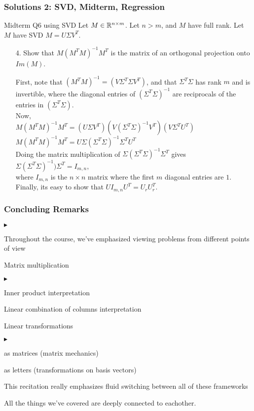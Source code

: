\documentclass{beamer}
\renewenvironment{itemize}
\renewenvironment{enumerate}%
{\begin{list}{\arabic{enumi}.}%
      {\setlength{\leftmargin}{2.5em}%
       \setlength{\itemsep}{-\parsep}%
       \setlength{\topsep}{-\parskip}%
       \usecounter{enumi}}%
 }{\end{list}}
\renewenvironment{itemize}%
{\begin{list}{$\blacktriangleright$}%
      {\setlength{\leftmargin}{2.5em}%
       \setlength{\itemsep}{-\parsep}%
       \setlength{\topsep}{-\parskip}%
       \usecounter{enumi}}%
 }{\end{list}}
\begin{document}
\begin{frame}
\frametitle{Solutions 2: SVD, Midterm, Regression}
Midterm Q6 using SVD
Let $M\in \mathbb{R}^{n\times m}$. Let $n>m$, and $M$ have full rank. Let $M$ have SVD $M= U\Sigma V^T$.
\begin{enumerate}
\item[4.] Show that $M(M^TM)^{-1}M^T$ is the matrix of an orthogonal projection onto $Im(M)$.
\begin{solution}
First, note that $(M^TM)^{-1} = (V \Sigma^T \Sigma V^T)$, and that $\Sigma^T \Sigma$ has rank $m$ and is invertible, where the diagonal entries of $(\Sigma^T \Sigma)^{-1}$ are reciprocals of the entries in $(\Sigma^T \Sigma)$. \\
Now,  \\
\quad $M(M^TM)^{-1}M^T = (U \Sigma V^T)(V (\Sigma^T \Sigma)^{-1} V^T)(V \Sigma^T U^T) $ \\ 
\quad $M(M^TM)^{-1}M^T = U \Sigma (\Sigma^T \Sigma)^{-1} \Sigma^T U^T $ \\ 
Doing the matrix multiplication of  $\Sigma (\Sigma^T \Sigma)^{-1} \Sigma^T $ gives \\

\quad $\Sigma (\Sigma^T \Sigma)^{-1}) \Sigma^T = I_{m,n}$,\\
where $I_{m,n}$ is the $n\times n$ matrix where the first $m$ diagonal entries are $1$. \\
Finally, its easy to show that $UI_{m,n}U^T = U_rU_r^T$.


\end{solution}
\end{enumerate}

\end{frame}

\begin{frame}
\frametitle{Concluding Remarks}
\begin{itemize}
\item Throughout the course, we've emphasized viewing problems from different points of view
\item Matrix multiplication
\begin{itemize}
\item Inner product interpretation
\item Linear combination of columns interpretation
\end{itemize}

\item Linear transformations
\begin{itemize}
\item as matrices (matrix mechanics)
\item as letters (transformations on basis vectors)
\end{itemize}
\item This recitation really emphasizes fluid switching between all of these frameworks
\item All the things we've covered are deeply connected to eachother.
\end{itemize}
\end{frame}
\end{document}
